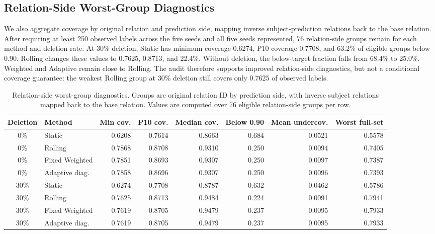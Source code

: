 \documentclass[10pt,twocolumn]{article}
\begin{document}
\subsection{Relation-Side Worst-Group Diagnostics}

We also aggregate coverage by original relation and prediction side, mapping
inverse subject-prediction relations back to the base relation. After requiring
at least 250 observed labels across the five seeds and all five seeds
represented, 76 relation-side groups remain for each method and deletion rate.
At 30\% deletion, Static has minimum coverage 0.6274, P10 coverage 0.7708, and
63.2\% of eligible groups below 0.90. Rolling changes these values to 0.7625,
0.8713, and 22.4\%. Without deletion, the below-target fraction falls from
68.4\% to 25.0\%. Weighted and Adaptive remain close to Rolling. The audit
therefore supports improved relation-side diagnostics, but not a conditional
coverage guarantee: the weakest Rolling group at 30\% deletion still covers
only 0.7625 of observed labels.

\begin{table}[t]
\centering
\caption{Relation-side worst-group diagnostics. Groups are original relation
ID by prediction side, with inverse subject relations mapped back to the base
relation. Values are computed over 76 eligible relation-side groups per row.}
\label{tab:relation-worst}
\footnotesize
\setlength{\tabcolsep}{4pt}
\begin{tabular}{clrrrrrr}
\toprule
Deletion & Method & Min cov. & P10 cov. & Median cov. & Below 0.90 & Mean undercov. & Worst full-set\\
\midrule
0\% & Static & 0.6208 & 0.7614 & 0.8663 & 0.684 & 0.0521 & 0.5578\\
0\% & Rolling & 0.7868 & 0.8708 & 0.9310 & 0.250 & 0.0094 & 0.7405\\
0\% & Fixed Weighted & 0.7851 & 0.8693 & 0.9307 & 0.250 & 0.0097 & 0.7387\\
0\% & Adaptive diag. & 0.7858 & 0.8696 & 0.9307 & 0.250 & 0.0096 & 0.7393\\
\midrule
30\% & Static & 0.6274 & 0.7708 & 0.8787 & 0.632 & 0.0462 & 0.5786\\
30\% & Rolling & 0.7625 & 0.8713 & 0.9484 & 0.224 & 0.0091 & 0.7941\\
30\% & Fixed Weighted & 0.7619 & 0.8705 & 0.9479 & 0.237 & 0.0095 & 0.7933\\
30\% & Adaptive diag. & 0.7619 & 0.8705 & 0.9479 & 0.237 & 0.0095 & 0.7933\\
\bottomrule
\end{tabular}
\end{table}
\end{document}
